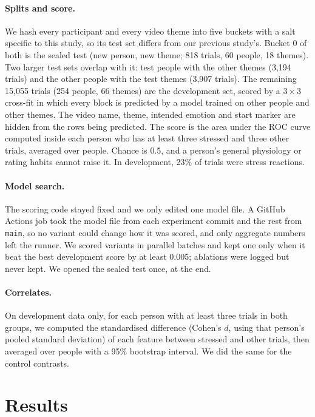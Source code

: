 \documentclass[10pt]{article}
\begin{document}
\paragraph{Splits and score.} We hash every participant and every video theme into five
buckets with a salt specific to this study, so its test set differs from our
previous study's. Bucket 0 of both is the sealed test (new person, new theme;
818 trials, 60 people, 18 themes). Two larger test sets overlap with it: test
people with the other themes (3,194 trials) and the other people with the test
themes (3,907 trials). The remaining 15,055 trials (254 people, 66 themes) are
the development set, scored by a $3\times3$ cross-fit in which every block is
predicted by a model trained on other people and other themes. The video
name, theme, intended emotion and start marker are hidden from the rows being
predicted. The score is the area under the ROC curve computed inside each
person who has at least three stressed and three other trials, averaged over
people. Chance is 0.5, and a person's general physiology or rating habits
cannot raise it. In development, 23\% of trials were stress reactions.

\paragraph{Model search.} The scoring code stayed fixed and we only edited one
model file. A GitHub Actions job took the model file from each experiment
commit and the rest from \texttt{main}, so no variant could change how it was
scored, and only aggregate numbers left the runner. We scored variants in
parallel batches and kept one only when it beat the best development score by
at least 0.005; ablations were logged but never kept. We opened the sealed test
once, at the end.

\paragraph{Correlates.} On development data only, for each person with at
least three trials in both groups, we computed the standardised difference
(Cohen's $d$, using that person's pooled standard deviation) of each feature
between stressed and other trials, then averaged over people with a 95\%
bootstrap interval. We did the same for the control contrasts.

\section{Results}
\end{document}

